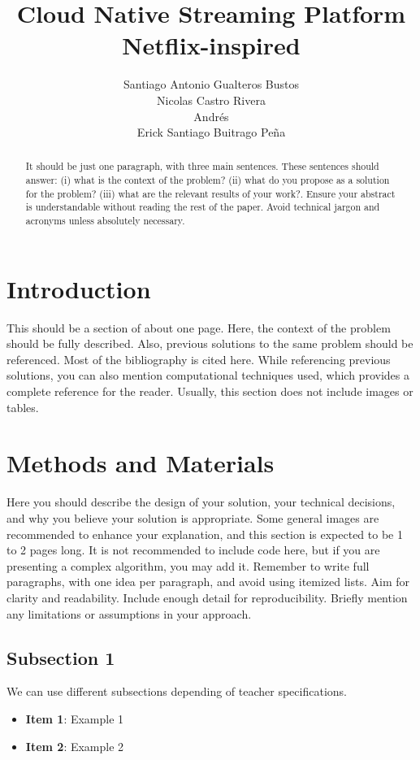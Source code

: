 \documentclass{article}
\title{Cloud Native Streaming Platform Netflix-inspired}
\author{ Santiago Antonio Gualteros Bustos \\ Nicolas Castro Rivera \\ Andrés \\ Erick Santiago Buitrago Peña   }
\date{}
\begin{document}
\maketitle

\begin{abstract}
It should be just one paragraph, with three main sentences. These sentences should answer: (i) what is the context of the problem? (ii) what do you propose
as a solution for the problem? (iii) what are the relevant results of your work?. Ensure your abstract is understandable without reading the rest of the paper. Avoid
technical jargon and acronyms unless absolutely necessary.

\end{abstract}

\section{Introduction}
This should be a section of about one page. Here, the context of
the problem should be fully described. Also, previous solutions to the same problem
should be referenced. Most of the bibliography is cited here. While referencing previous solutions, you can also mention computational techniques used, which provides a complete reference for the reader. Usually, this section does not include images or
tables.

\section{Methods and Materials}
Here you should describe the design of your solution, your
technical decisions, and why you believe your solution is appropriate. Some general
images are recommended to enhance your explanation, and this section is expected
to be 1 to 2 pages long. It is not recommended to include code here, but if you are
presenting a complex algorithm, you may add it. Remember to write full paragraphs,
with one idea per paragraph, and avoid using itemized lists. Aim for clarity and
readability. Include enough detail for reproducibility. Briefly mention any limitations
or assumptions in your approach.

\subsection{Subsection 1}
We can use different subsections depending of teacher specifications.

\begin{itemize}
    \item \textbf{Item 1}: Example 1
    \item \textbf{Item 2}: Example 2
\end{itemize}
\end{document}
